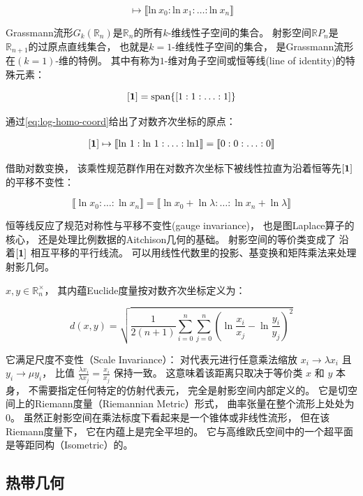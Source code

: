﻿\documentclass[10pt,a4paper]{article}
\begin{document}
\begin{equation}
[x_0:x_1:\ldots:x_n] \mapsto \llbracket \text{ln} \ x_0 : \text{ln} \ x_1 : \ldots : \text{ln} \ x_n \rrbracket
\label{eq:log-homo-coord}
\end{equation}

Grassmann流形$G_k(\mathbb R_n)$是$\mathbb R_n$的所有$k$-维线性子空间的集合。
射影空间$\mathbb R P_n$是$\mathbb R_{n+1}$的过原点直线集合，
也就是$k = 1$-维线性子空间的集合，
是Grassmann流形在$(k = 1)$-维的特例。
其中有称为$1$-维对角子空间或恒等线(line of identity)的特殊元素：

$$
[\textbf 1] = \text{span}\{[1:1:\ldots:1]\}
$$

通过\eqref{eq:log-homo-coord}给出了对数齐次坐标的原点：

$$
\begin{aligned}
[\textbf 1] \mapsto 
\llbracket \text{ln} \ 1 : \text{ln} \ 1 : \ldots : \text{ln} 1 \rrbracket
= \llbracket 0 : 0 : \ldots : 0 \rrbracket \\
\end{aligned}
$$

借助对数变换，
该乘性规范群作用在对数齐次坐标下被线性拉直为沿着恒等先$[\textbf 1]$ 的平移不变性：

$$
\llbracket \ln x_0 : \ldots : \ln x_n \rrbracket = \llbracket \ln x_0 + \ln \lambda : \ldots : \ln x_n + \ln \lambda \rrbracket
$$

恒等线反应了规范对称性与平移不变性(gauge invariance)，
也是图Laplace算子的核心，
还是处理比例数据的Aitchison几何的基础。
射影空间的等价类变成了
沿着$[\textbf 1]$ 相互平移的平行线流。
可以用线性代数里的投影、基变换和矩阵乘法来处理射影几何。

$x,y\in\mathbb R^\times_n$，
其内蕴Euclide度量按对数齐次坐标定义为：

$$ 
d(x,y) = 
\sqrt{\frac{1}{2(n+1)} \sum_{i=0}^n \sum_{j=0}^n \left( \ln\frac{x_i}{x_j} - \ln\frac{y_i}{y_j} \right)^2} 
$$

它满足尺度不变性（Scale Invariance）：
对代表元进行任意乘法缩放
$x_i \to \lambda x_i$ 且 $y_i \to \mu y_i$，
比值 $\frac{\lambda x_i}{\lambda x_j} = \frac{x_i}{x_j}$ 保持一致。
这意味着该距离只取决于等价类 $x$ 和 $y$ 本身，
不需要指定任何特定的仿射代表元，
完全是射影空间内部定义的。
它是切空间上的Riemann度量（Riemannian Metric）形式，
曲率张量在整个流形上处处为$0$。
虽然正射影空间在乘法标度下看起来是一个锥体或非线性流形，
但在该Riemann度量下，
它在内蕴上是完全平坦的。
它与高维欧氏空间中的一个超平面是等距同构（Isometric）的。


\subsection{热带几何}
\end{document}
